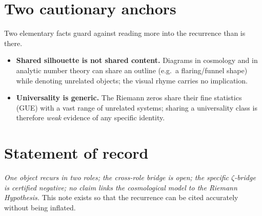 \documentclass[11pt]{article}
\begin{document}
\section{Two cautionary anchors}
Two elementary facts guard against reading more into the recurrence than is there.
\begin{itemize}
  \item \textbf{Shared silhouette is not shared content.} Diagrams in cosmology and
  in analytic number theory can share an outline (e.g.\ a flaring/funnel shape)
  while denoting unrelated objects; the visual rhyme carries no implication.
  \item \textbf{Universality is generic.} The Riemann zeros share their fine
  statistics (GUE) with a vast range of unrelated systems; sharing a universality
  class is therefore \emph{weak} evidence of any specific identity.
\end{itemize}

\section{Statement of record}
\emph{One object recurs in two roles; the cross-role bridge is open; the specific
$\zeta$-bridge is certified negative; no claim links the cosmological model to the
Riemann Hypothesis.} This note exists so that the recurrence can be cited accurately
without being inflated.
\end{document}
